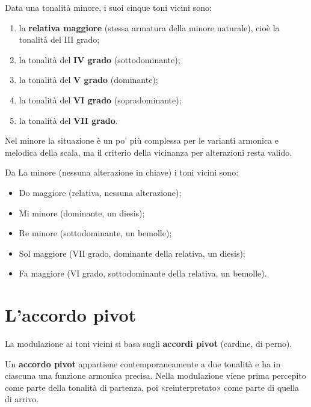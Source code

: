 \begin{regola}
	\label{reg:toni_vicini_minore}
	Data una tonalità minore, i suoi cinque toni vicini sono:
	\begin{enumerate}
		\item la \textbf{relativa maggiore} (stessa armatura della minore naturale), cioè la tonalità del III grado;
		\item la tonalità del \textbf{IV grado} (sottodominante);
		\item la tonalità del \textbf{V grado} (dominante);
		\item la tonalità del \textbf{VI grado} (sopradominante);
		\item la tonalità del \textbf{VII grado}.
	\end{enumerate}
	Nel minore la situazione è un po' più complessa per le varianti armonica e melodica della scala, ma il criterio della vicinanza per alterazioni resta valido.
\end{regola}

\begin{esempio}
	\label{ex:toni_vicini_la_m}
	Da La minore (nessuna alterazione in chiave) i toni vicini sono:
	\begin{itemize}
		\item Do maggiore (relativa, nessuna alterazione);
		\item Mi minore (dominante, un diesis);
		\item Re minore (sottodominante, un bemolle);
		\item Sol maggiore (VII grado, dominante della relativa, un diesis);
		\item Fa maggiore (VI grado, sottodominante della relativa, un bemolle).
	\end{itemize}
\end{esempio}

\section{L'accordo pivot}
\label{sec:accordo_pivot}

La modulazione ai toni vicini si basa sugli \textbf{accordi pivot} (cardine, di perno).

\begin{definizione}
	\label{def:accordo_pivot}
	Un \textbf{accordo pivot} appartiene contemporaneamente a due tonalità e ha in ciascuna una funzione armonica precisa. Nella modulazione viene prima percepito come parte della tonalità di partenza, poi «reinterpretato» come parte di quella di arrivo.
\end{definizione}

